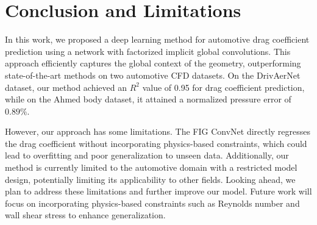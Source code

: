 


\section{Conclusion and Limitations}
In this work, we proposed a deep learning method for automotive drag coefficient prediction using a network with factorized implicit global convolutions. This approach efficiently captures the global context of the geometry, outperforming state-of-the-art methods on two automotive CFD datasets. On the DrivAerNet dataset, our method achieved an $R^2$ value of 0.95 for drag coefficient prediction, while on the Ahmed body dataset, it attained a normalized pressure error of $0.89\%$.

However, our approach has some limitations. The FIG ConvNet directly regresses the drag coefficient without incorporating physics-based constraints, which could lead to overfitting and poor generalization to unseen data. Additionally, our method is currently limited to the automotive domain with a restricted model design, potentially limiting its applicability to other fields.
Looking ahead, we plan to address these limitations and further improve our model. Future work will focus on incorporating physics-based constraints such as Reynolds number and wall shear stress to enhance generalization.
